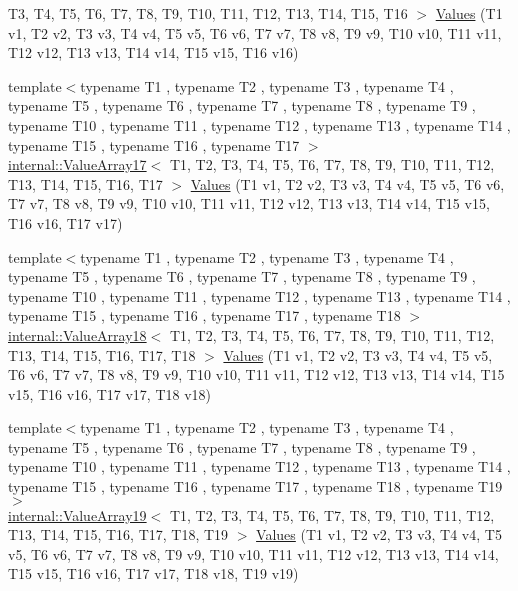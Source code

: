 \begin{DoxyCompactItemize}
\-T3, \-T4, \-T5, \-T6, \-T7, \-T8, \-T9, \*
\-T10, \-T11, \-T12, \-T13, \-T14, \-T15, \*
\-T16 $>$ \hyperlink{namespacetesting_afebcdc503d4a99cae5924523dcfd02e1}{\-Values} (\-T1 v1, \-T2 v2, \-T3 v3, \-T4 v4, \-T5 v5, \-T6 v6, \-T7 v7, \-T8 v8, \-T9 v9, \-T10 v10, \-T11 v11, \-T12 v12, \-T13 v13, \-T14 v14, \-T15 v15, \-T16 v16)
\item 
{\footnotesize template$<$typename T1 , typename T2 , typename T3 , typename T4 , typename T5 , typename T6 , typename T7 , typename T8 , typename T9 , typename T10 , typename T11 , typename T12 , typename T13 , typename T14 , typename T15 , typename T16 , typename T17 $>$ }\\\hyperlink{classtesting_1_1internal_1_1ValueArray17}{internal\-::\-Value\-Array17}$<$ \-T1, \-T2, \*
\-T3, \-T4, \-T5, \-T6, \-T7, \-T8, \-T9, \*
\-T10, \-T11, \-T12, \-T13, \-T14, \-T15, \*
\-T16, \-T17 $>$ \hyperlink{namespacetesting_a5cb89ee5c491cbe65de523f9f1bc1987}{\-Values} (\-T1 v1, \-T2 v2, \-T3 v3, \-T4 v4, \-T5 v5, \-T6 v6, \-T7 v7, \-T8 v8, \-T9 v9, \-T10 v10, \-T11 v11, \-T12 v12, \-T13 v13, \-T14 v14, \-T15 v15, \-T16 v16, \-T17 v17)
\item 
{\footnotesize template$<$typename T1 , typename T2 , typename T3 , typename T4 , typename T5 , typename T6 , typename T7 , typename T8 , typename T9 , typename T10 , typename T11 , typename T12 , typename T13 , typename T14 , typename T15 , typename T16 , typename T17 , typename T18 $>$ }\\\hyperlink{classtesting_1_1internal_1_1ValueArray18}{internal\-::\-Value\-Array18}$<$ \-T1, \-T2, \*
\-T3, \-T4, \-T5, \-T6, \-T7, \-T8, \-T9, \*
\-T10, \-T11, \-T12, \-T13, \-T14, \-T15, \*
\-T16, \-T17, \-T18 $>$ \hyperlink{namespacetesting_ab442a00c98b4bfb3bfa81f5e06bf53f9}{\-Values} (\-T1 v1, \-T2 v2, \-T3 v3, \-T4 v4, \-T5 v5, \-T6 v6, \-T7 v7, \-T8 v8, \-T9 v9, \-T10 v10, \-T11 v11, \-T12 v12, \-T13 v13, \-T14 v14, \-T15 v15, \-T16 v16, \-T17 v17, \-T18 v18)
\item 
{\footnotesize template$<$typename T1 , typename T2 , typename T3 , typename T4 , typename T5 , typename T6 , typename T7 , typename T8 , typename T9 , typename T10 , typename T11 , typename T12 , typename T13 , typename T14 , typename T15 , typename T16 , typename T17 , typename T18 , typename T19 $>$ }\\\hyperlink{classtesting_1_1internal_1_1ValueArray19}{internal\-::\-Value\-Array19}$<$ \-T1, \-T2, \*
\-T3, \-T4, \-T5, \-T6, \-T7, \-T8, \-T9, \*
\-T10, \-T11, \-T12, \-T13, \-T14, \-T15, \*
\-T16, \-T17, \-T18, \-T19 $>$ \hyperlink{namespacetesting_a673757dbfc048bbb48e459485b30b2bf}{\-Values} (\-T1 v1, \-T2 v2, \-T3 v3, \-T4 v4, \-T5 v5, \-T6 v6, \-T7 v7, \-T8 v8, \-T9 v9, \-T10 v10, \-T11 v11, \-T12 v12, \-T13 v13, \-T14 v14, \-T15 v15, \-T16 v16, \-T17 v17, \-T18 v18, \-T19 v19)

\end{DoxyCompactItemize}

